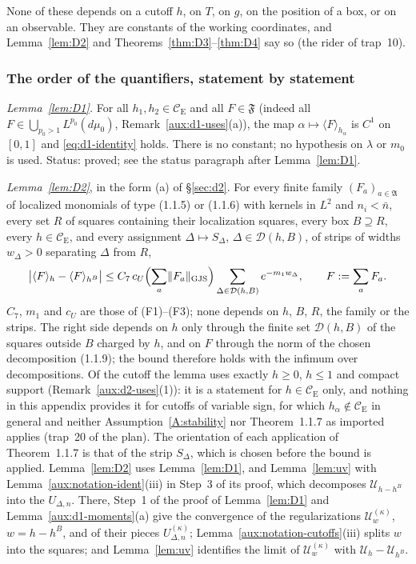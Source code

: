 \documentclass[11pt,a4paper]{article}
\theoremstyle{plain}
\theoremstyle{definition}
\theoremstyle{plain}
\theoremstyle{definition}
\newcommand{\CE}{\mathcal{C}_{\mathrm E}}
\newcommand{\GJS}[1]{\lVert #1\rVert_{\mathrm{GJS}}}   %
\newcommand{\ev}[2]{\langle #1\rangle_{#2}}            %
\newcommand{\Uc}{\mathcal U}
\newcommand{\dmu}{d\mu_0}
\begin{document}
None of these depends on a cutoff $h$, on $T$, on $g$, on the position of a box, or on an
observable. They are constants of the working coordinates, and Lemma~\ref{lem:D2} and
Theorems~\ref{thm:D3}--\ref{thm:D4} say so (the rider of trap~10).

\subsubsection{The order of the quantifiers, statement by statement}\label{sec:quant-order}

\emph{Lemma~\ref{lem:D1}.} For all $h_1,h_2\in\CE$ and all $F\in\mathfrak F$ (indeed all
$F\in\bigcup_{p_0>1}L^{p_0}(\dmu)$, Remark~\ref{aux:d1-uses}(a)), the map
$\alpha\mapsto\ev{F}{h_\alpha}$ is $C^1$ on $[0,1]$ and \eqref{eq:d1-identity} holds. There is
no constant; no hypothesis on $\lambda$ or $m_0$ is used.  Status: proved; see the status paragraph after
Lemma~\ref{lem:D1}.

\emph{Lemma~\ref{lem:D2}}, in the form (a) of \S\ref{sec:d2}. For every finite family
$(F_a)_{a\in\mathfrak A}$ of localized monomials of type (1.1.5) or (1.1.6) with kernels in
$L^2$ and $n_i<\bar n$, every set $R$ of squares containing their localization squares, every
box $B\supseteq R$, every $h\in\CE$, and every assignment $\Delta\mapsto S_\Delta$,
$\Delta\in\mathcal D(h,B)$, of strips of widths $w_\Delta>0$ separating $\Delta$ from $R$,
\[
 \bigl|\ev{F}{h}-\ev{F}{h^B}\bigr|\le C_7\,c_U\Bigl(\sum_a\GJS{F_a}\Bigr)
 \sum_{\Delta\in\mathcal D(h,B)}e^{-m_1w_\Delta},\qquad F:=\sum_aF_a .
\]
$C_7$, $m_1$ and $c_U$ are those of (F1)--(F3); none depends on $h$, $B$, $R$, the family or the
strips. The right side depends on $h$ only through the finite set $\mathcal D(h,B)$ of the
squares outside $B$ charged by $h$, and on $F$ through the norm of the chosen decomposition
(1.1.9); the bound therefore holds with the infimum over decompositions. Of the cutoff the
lemma uses exactly $h\ge0$, $h\le1$ and compact support (Remark~\ref{aux:d2-uses}(1)): it is a
statement for $h\in\CE$ only, and nothing in this appendix provides it for cutoffs of variable sign,
for which $h_\alpha\notin\CE$ in general and neither Assumption~\ref{A:stability} nor Theorem~1.1.7 as
imported applies (trap~20 of the plan). The orientation of each application of
Theorem~1.1.7 is that of the strip $S_\Delta$, which is chosen before the bound is applied.
Lemma~\ref{lem:D2} uses Lemma~\ref{lem:D1}, and Lemma~\ref{lem:uv} with
Lemma~\ref{aux:notation-ident}(iii) in Step~3 of its proof, which decomposes $\Uc_{h-h^B}$ into the
$U_{\Delta,n}$.  There, Step~1 of the proof of Lemma~\ref{lem:D1} and
Lemma~\ref{aux:d1-moments}(a) give the convergence of the regularizations $\Uc^{(\kappa)}_w$,
$w=h-h^B$, and of their pieces $U^{(\kappa)}_{\Delta,n}$; Lemma~\ref{aux:notation-cutoffs}(iii)
splits $w$ into the squares; and Lemma~\ref{lem:uv} identifies the limit of $\Uc^{(\kappa)}_w$ with
$\Uc_h-\Uc_{h^B}$.
\end{document}
